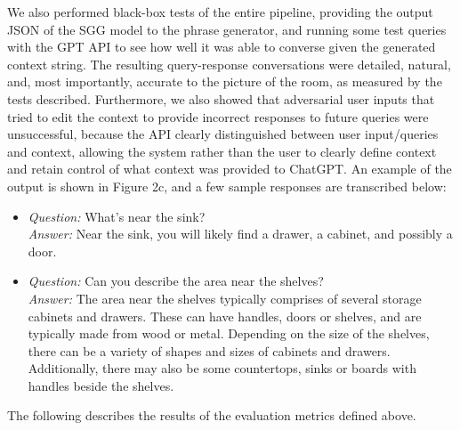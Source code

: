 \documentclass[letterpaper, 10 pt, conference]{ieeeconf}  %
\begin{document}
\begin{figure}
    \end{figure}

    We also performed black-box tests of the entire pipeline, providing the output JSON of the SGG model to the phrase generator, and running some test queries with the GPT API to see how well it was able to converse given the generated context string. The resulting query-response conversations were detailed, natural, and, most importantly, accurate to the picture of the room, as measured by the tests described. Furthermore, we also showed that adversarial user inputs that tried to edit the context to provide incorrect responses to future queries were unsuccessful, because the API clearly distinguished between user input/queries and context, allowing the system rather than the user to clearly define context and retain control of what context was provided to ChatGPT. An example of the output is shown in Figure 2c, and a few sample responses are transcribed below:
    \begin{itemize}
        \item \textit{Question:} What's near the sink? \\ \textit{Answer:} Near the sink, you will likely find a drawer, a cabinet, and possibly a door.
        \item \textit{Question:} Can you describe the area near the shelves? \\ \textit{Answer:} The area near the shelves typically comprises of several storage cabinets and drawers. These can have handles, doors or shelves, and are typically made from wood or metal. Depending on the size of the shelves, there can be a variety of shapes and sizes of cabinets and drawers. Additionally, there may also be some countertops, sinks or boards with handles beside the shelves.
    \end{itemize}

    The following describes the results of the evaluation metrics defined above.
\end{document}
